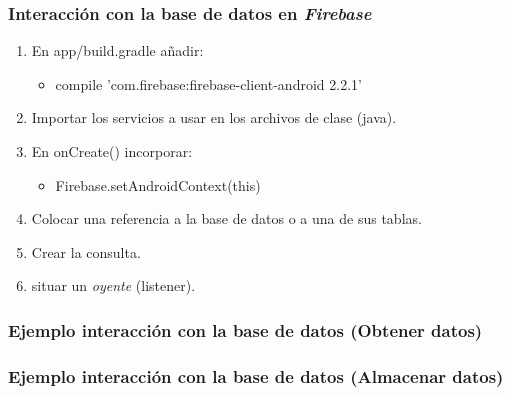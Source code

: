
\begin{frame}
	\frametitle{Interacción con la base de datos en {\it Firebase}}
	\begin{enumerate}
		\item En {\ttfamily app/build.gradle} añadir:
		\begin{itemize}
			\item {\ttfamily compile 'com.firebase:firebase-client-android 2.2.1'}
		\end{itemize}
		\item Importar los servicios a usar en los archivos de clase ({\ttfamily java}).
		\item  En {\ttfamily onCreate()} incorporar:
		\begin{itemize}
			\item {\ttfamily Firebase.setAndroidContext(this)}
		\end{itemize}
		\item Colocar una referencia a la base de datos o a una de sus tablas.
		\item Crear la consulta.
		\item situar un {\it oyente} ({\ttfamily listener}).
	\end{enumerate}
	\endblock{}
\end{frame}


\begin{frame}
	\frametitle{Ejemplo interacción con la base de datos (Obtener datos)}
	
\end{frame}


\begin{frame}
	\frametitle{Ejemplo interacción con la base de datos (Almacenar datos)}
	
\end{frame}


